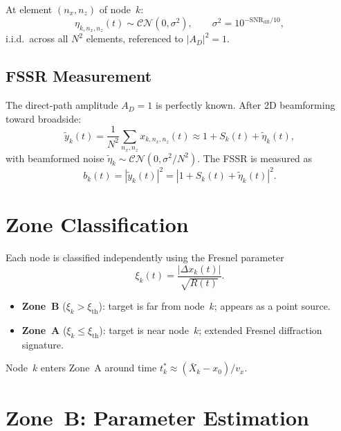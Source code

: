 \documentclass[11pt,a4paper]{article}
\begin{document}
At element $(n_x,n_z)$ of node~$k$:
\begin{equation}
  \eta_{k,n_x,n_z}(t)\sim\mathcal{CN}(0,\sigma^2),
  \qquad\sigma^2=10^{-\mathrm{SNR}_{\mathrm{dB}}/10},
  \label{eq:noise}
\end{equation}
i.i.d.\ across all $N^2$ elements, referenced to $|A_D|^2=1$.

\subsection{FSSR Measurement}

The direct-path amplitude $A_D=1$ is perfectly known.  After 2D
beamforming toward broadside:
\begin{equation}
  \tilde{y}_k(t) = \frac{1}{N^2}\sum_{n_x,n_z}x_{k,n_x,n_z}(t)
  \approx 1+S_k(t)+\tilde{\eta}_k(t),
  \label{eq:beamformed}
\end{equation}
with beamformed noise
$\tilde{\eta}_k\sim\mathcal{CN}(0,\sigma^2/N^2)$.  The FSSR is
measured as
\begin{equation}
  b_k(t)=|\tilde{y}_k(t)|^2
  =|1+S_k(t)+\tilde{\eta}_k(t)|^2.
  \label{eq:bk}
\end{equation}

\section{Zone Classification}
\label{sec:zones}

Each node is classified independently using the Fresnel parameter
\begin{equation}
  \xi_k(t)=\frac{|\Delta x_k(t)|}{\sqrt{R(t)}}.
  \label{eq:xi}
\end{equation}
\begin{itemize}
  \item \textbf{Zone~B} ($\xi_k>\xi_{\mathrm{th}}$): target is far
    from node~$k$; appears as a point source.
  \item \textbf{Zone~A} ($\xi_k\le\xi_{\mathrm{th}}$): target is
    near node~$k$; extended Fresnel diffraction signature.
\end{itemize}
Node~$k$ enters Zone~A around time
$t_k^*\approx(\bar{X}_k-x_0)/v_x$.

\section{Zone~B: Parameter Estimation}
\label{sec:zone_b}
\end{document}
